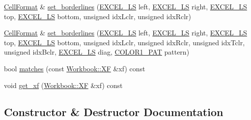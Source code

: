 \begin{DoxyCompactItemize}
\hyperlink{struct_excel_format_1_1_cell_format}{Cell\+Format} \& \hyperlink{struct_excel_format_1_1_cell_format_a3f1e70708c0836e8ab66df96b4fe58f3}{set\+\_\+borderlines} (\hyperlink{namespace_excel_format_af723db0cf2ef2243e273dcf782c51355}{E\+X\+C\+E\+L\+\_\+\+L\+S} left, \hyperlink{namespace_excel_format_af723db0cf2ef2243e273dcf782c51355}{E\+X\+C\+E\+L\+\_\+\+L\+S} right, \hyperlink{namespace_excel_format_af723db0cf2ef2243e273dcf782c51355}{E\+X\+C\+E\+L\+\_\+\+L\+S} top, \hyperlink{namespace_excel_format_af723db0cf2ef2243e273dcf782c51355}{E\+X\+C\+E\+L\+\_\+\+L\+S} bottom, unsigned idx\+Lclr, unsigned idx\+Rclr)
\item 
\hyperlink{struct_excel_format_1_1_cell_format}{Cell\+Format} \& \hyperlink{struct_excel_format_1_1_cell_format_a1668bb80540887b923b2aa620fa9067e}{set\+\_\+borderlines} (\hyperlink{namespace_excel_format_af723db0cf2ef2243e273dcf782c51355}{E\+X\+C\+E\+L\+\_\+\+L\+S} left, \hyperlink{namespace_excel_format_af723db0cf2ef2243e273dcf782c51355}{E\+X\+C\+E\+L\+\_\+\+L\+S} right, \hyperlink{namespace_excel_format_af723db0cf2ef2243e273dcf782c51355}{E\+X\+C\+E\+L\+\_\+\+L\+S} top, \hyperlink{namespace_excel_format_af723db0cf2ef2243e273dcf782c51355}{E\+X\+C\+E\+L\+\_\+\+L\+S} bottom, unsigned idx\+Lclr, unsigned idx\+Rclr, unsigned idx\+Tclr, unsigned idx\+Bclr, \hyperlink{namespace_excel_format_af723db0cf2ef2243e273dcf782c51355}{E\+X\+C\+E\+L\+\_\+\+L\+S} diag, \hyperlink{namespace_excel_format_ac32635705247b08ca94547c6d08b9f2f}{C\+O\+L\+O\+R1\+\_\+\+P\+A\+T} pattern)
\item 
bool \hyperlink{struct_excel_format_1_1_cell_format_a89917ae10c082ab984acc51d172620ab}{matches} (const \hyperlink{struct_y_excel_1_1_workbook_1_1_x_f}{Workbook\+::\+X\+F} \&xf) const 
\item 
void \hyperlink{struct_excel_format_1_1_cell_format_ab74018c3f4ff008ad530da7c674d1962}{get\+\_\+xf} (\hyperlink{struct_y_excel_1_1_workbook_1_1_x_f}{Workbook\+::\+X\+F} \&xf) const 
\end{DoxyCompactItemize}


\subsection{Constructor \& Destructor Documentation}
\hypertarget{struct_excel_format_1_1_cell_format_a78f64bc1a0b7b6f7406e972d3a715bd4}{}
